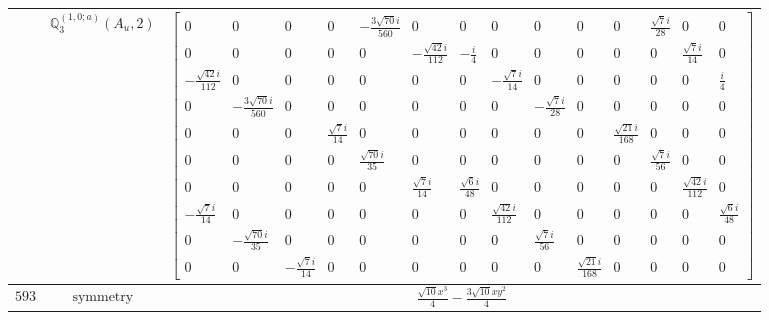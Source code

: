 \documentclass[fleqn,8pt,landscape]{jsarticle}
\begin{document}
\begin{longtable}{ccc}
$  $ & $ \mathbb{Q}_{3}^{(1,0;a)}(A_{u},2) $ & $ \begin{bmatrix} 0 & 0 & 0 & 0 & - \frac{3 \sqrt{70} i}{560} & 0 & 0 & 0 & 0 & 0 & 0 & \frac{\sqrt{7} i}{28} & 0 & 0 \\ 0 & 0 & 0 & 0 & 0 & - \frac{\sqrt{42} i}{112} & - \frac{i}{4} & 0 & 0 & 0 & 0 & 0 & \frac{\sqrt{7} i}{14} & 0 \\ - \frac{\sqrt{42} i}{112} & 0 & 0 & 0 & 0 & 0 & 0 & - \frac{\sqrt{7} i}{14} & 0 & 0 & 0 & 0 & 0 & \frac{i}{4} \\ 0 & - \frac{3 \sqrt{70} i}{560} & 0 & 0 & 0 & 0 & 0 & 0 & - \frac{\sqrt{7} i}{28} & 0 & 0 & 0 & 0 & 0 \\ 0 & 0 & 0 & \frac{\sqrt{7} i}{14} & 0 & 0 & 0 & 0 & 0 & 0 & \frac{\sqrt{21} i}{168} & 0 & 0 & 0 \\ 0 & 0 & 0 & 0 & \frac{\sqrt{70} i}{35} & 0 & 0 & 0 & 0 & 0 & 0 & \frac{\sqrt{7} i}{56} & 0 & 0 \\ 0 & 0 & 0 & 0 & 0 & \frac{\sqrt{7} i}{14} & \frac{\sqrt{6} i}{48} & 0 & 0 & 0 & 0 & 0 & \frac{\sqrt{42} i}{112} & 0 \\ - \frac{\sqrt{7} i}{14} & 0 & 0 & 0 & 0 & 0 & 0 & \frac{\sqrt{42} i}{112} & 0 & 0 & 0 & 0 & 0 & \frac{\sqrt{6} i}{48} \\ 0 & - \frac{\sqrt{70} i}{35} & 0 & 0 & 0 & 0 & 0 & 0 & \frac{\sqrt{7} i}{56} & 0 & 0 & 0 & 0 & 0 \\ 0 & 0 & - \frac{\sqrt{7} i}{14} & 0 & 0 & 0 & 0 & 0 & 0 & \frac{\sqrt{21} i}{168} & 0 & 0 & 0 & 0 \end{bmatrix} $ \\ \hline
$ 593 $ & $ \text{symmetry} $ & $ \frac{\sqrt{10} x^{3}}{4} - \frac{3 \sqrt{10} x y^{2}}{4} $ \\

\end{longtable}
\end{document}
